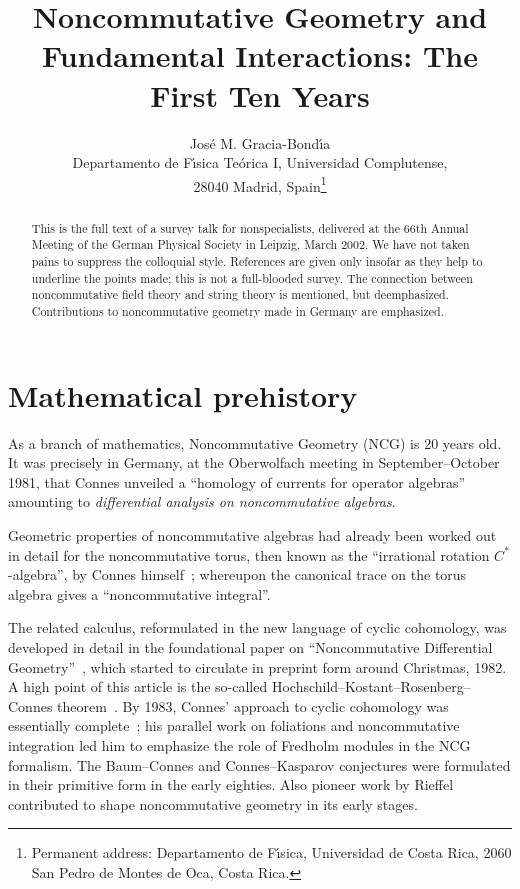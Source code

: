 \documentclass[a4paper,12pt]{article}
\title{Noncommutative Geometry and Fundamental Interactions:
The First Ten Years}
\author{
Jos\'e M. Gracia-Bond\'{\i}a\\[1pc]
Departamento de F\'{\i}sica Te\'orica I, Universidad Complutense,\\
28040 Madrid, Spain\thanks{
Permanent address: 
Departamento de F\'{\i}sica, Universidad de Costa Rica,
2060 San Pedro de Montes de Oca, Costa Rica.}}
\newcommand{\1}{\mathbf{1}}         %
\newcommand{\7}{\dagger}            %
\newcommand{\8}{\bullet}            %
\renewcommand{\.}{\cdot}            %
\renewcommand{\:}{\colon}           %
\begin{document}
\maketitle


\begin{abstract}
This is the full text of a survey talk for nonspecialists, delivered
at the 66th Annual Meeting of the German Physical Society in Leipzig,
March 2002. We have not taken pains to suppress the colloquial style.
References are given only insofar as they help to underline the points
made; this is not a full-blooded survey. The connection between
noncommutative field theory and string theory is mentioned, but
deemphasized. Contributions to noncommutative geometry made in Germany
are emphasized.
\end{abstract}


\section{Mathematical prehistory}

As a branch of mathematics, Noncommutative Geometry (NCG) is 20 years
old. It was precisely in Germany, at the Oberwolfach meeting in
September--October 1981, that Connes unveiled a ``homology of currents
for operator algebras''~\cite{ConnesObW} amounting to
\textit{differential analysis on noncommutative algebras}.

Geometric properties of noncommutative algebras had already been
worked out in detail for the noncommutative torus, then known as the
``irrational rotation $C^*$-algebra'', by Connes
himself~\cite{ConnesTorus}; whereupon the canonical trace on the torus
algebra gives a ``noncommutative integral''.

The related calculus, reformulated in the new language of cyclic
cohomology, was developed in detail in the foundational paper on
``Noncommutative Differential Geometry''~\cite{ConnesNCDiffG}, which
started to circulate in preprint form around Christmas, 1982. A high
point of this article is the so-called
Hochschild--Kostant--Rosenberg--Connes theorem~\cite{Polaris}. By
1983, Connes' approach to cyclic cohomology was essentially
complete~\cite{ConnesLambda}; his parallel work on foliations and
noncommutative integration led him to emphasize the role of Fredholm
modules in the NCG formalism. The Baum--Connes and Connes--Kasparov
conjectures were formulated in their primitive form in the early
eighties. Also pioneer work by Rieffel~\cite{RieffelRot} contributed
to shape noncommutative geometry in its early stages.
\end{document}
